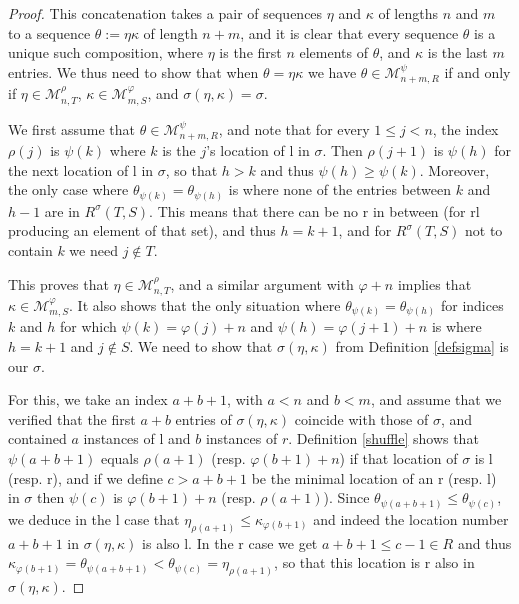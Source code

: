 \documentclass{article}
\theoremstyle{definition}
\begin{document}
\begin{proof}
This concatenation takes a pair of sequences $\eta$ and $\kappa$ of lengths $n$ and $m$ to a sequence $\theta:=\eta\kappa$ of length $n+m$, and it is clear that every sequence $\theta$ is a unique such composition, where $\eta$ is the first $n$ elements of $\theta$, and $\kappa$ is the last $m$ entries. We thus need to show that when $\theta=\eta\kappa$ we have $\theta\in\mathcal{M}_{n+m,R}^{\psi}$ if and only if $\eta\in\mathcal{M}_{n,T}^{\rho}$, $\kappa\in\mathcal{M}_{m,S}^{\varphi}$, and $\sigma(\eta,\kappa)=\sigma$.

We first assume that $\theta\in\mathcal{M}_{n+m,R}^{\psi}$, and note that for every $1 \leq j<n$, the index $\rho(j)$ is $\psi(k)$ where $k$ is the $j$'s location of l in $\sigma$. Then $\rho(j+1)$ is $\psi(h)$ for the next location of l in $\sigma$, so that $h>k$ and thus $\psi(h)\geq\psi(k)$. Moreover, the only case where $\theta_{\psi(k)}=\theta_{\psi(h)}$ is where none of the entries between $k$ and $h-1$ are in $R^{\sigma}(T,S)$. This means that there can be no r in between (for rl producing an element of that set), and thus $h=k+1$, and for $R^{\sigma}(T,S)$ not to contain $k$ we need $j \not\in T$.

This proves that $\eta\in\mathcal{M}_{n,T}^{\rho}$, and a similar argument with $\varphi+n$ implies that $\kappa\in\mathcal{M}_{m,S}^{\varphi}$. It also shows that the only situation where $\theta_{\psi(k)}=\theta_{\psi(h)}$ for indices $k$ and $h$ for which $\psi(k)=\varphi(j)+n$ and $\psi(h)=\varphi(j+1)+n$ is where $h=k+1$ and $j \not\in S$. We need to show that $\sigma(\eta,\kappa)$ from Definition \ref{defsigma} is our $\sigma$.

For this, we take an index $a+b+1$, with $a<n$ and $b<m$, and assume that we verified that the first $a+b$ entries of $\sigma(\eta,\kappa)$ coincide with those of $\sigma$, and contained $a$ instances of l and $b$ instances of $r$. Definition \ref{shuffle} shows that $\psi(a+b+1)$ equals $\rho(a+1)$ (resp. $\varphi(b+1)+n$) if that location of $\sigma$ is l (resp. r), and if we define $c>a+b+1$ be the minimal location of an r (resp. l) in $\sigma$ then $\psi(c)$ is $\varphi(b+1)+n$ (resp. $\rho(a+1)$). Since $\theta_{\psi(a+b+1)}\leq\theta_{\psi(c)}$, we deduce in the l case that $\eta_{\rho(a+1)}\leq\kappa_{\varphi(b+1)}$ and indeed the location number $a+b+1$ in $\sigma(\eta,\kappa)$ is also l. In the r case we get $a+b+1 \leq c-1 \in R$ and thus $\kappa_{\varphi(b+1)}=\theta_{\psi(a+b+1)}<\theta_{\psi(c)}=\eta_{\rho(a+1)}$, so that this location is r also in $\sigma(\eta,\kappa)$.


\end{proof}
\end{document}
